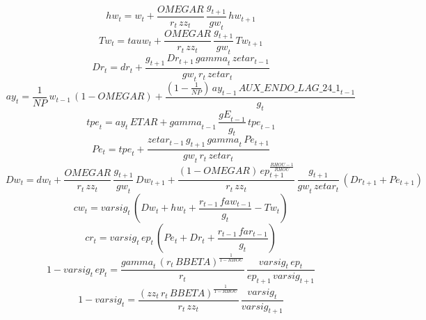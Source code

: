 \begin{dmath}
{hw}_{t}={w}_{t}+\frac{{OMEGAR}}{{r}_{t}\, {zz}_{t}}\, \frac{{g}_{t+1}}{{gw}_{t}}\, {hw}_{t+1}
\end{dmath}
\begin{dmath}
{Tw}_{t}={tauw}_{t}+\frac{{OMEGAR}}{{r}_{t}\, {zz}_{t}}\, \frac{{g}_{t+1}}{{gw}_{t}}\, {Tw}_{t+1}
\end{dmath}
\begin{dmath}
{Dr}_{t}={dr}_{t}+\frac{{g}_{t+1}\, {Dr}_{t+1}\, {gamma}_{t}\, {zetar}_{t-1}}{{gw}_{t}\, {r}_{t}\, {zetar}_{t}}
\end{dmath}
\begin{dmath}
{ay}_{t}=\frac{1}{{NP}}\, {w}_{t-1}\, \left(1-{OMEGAR}\right)+\frac{\left(1-\frac{1}{{NP}}\right)\, {ay}_{t-1}\, {AUX\_ENDO\_LAG\_24\_1}_{t-1}}{{g}_{t}}
\end{dmath}
\begin{dmath}
{tpe}_{t}={ay}_{t}\, {ETAR}+{gamma}_{t-1}\, \frac{{gE}_{t-1}}{{g}_{t}}\, {tpe}_{t-1}
\end{dmath}
\begin{dmath}
{Pe}_{t}={tpe}_{t}+\frac{{zetar}_{t-1}\, {g}_{t+1}\, {gamma}_{t}\, {Pe}_{t+1}}{{gw}_{t}\, {r}_{t}\, {zetar}_{t}}
\end{dmath}
\begin{dmath}
{Dw}_{t}={dw}_{t}+\frac{{OMEGAR}}{{r}_{t}\, {zz}_{t}}\, \frac{{g}_{t+1}}{{gw}_{t}}\, {Dw}_{t+1}+\frac{\left(1-{OMEGAR}\right)\, {ep}_{t+1}^{\frac{{RHOU}-1}{{RHOU}}}}{{r}_{t}\, {zz}_{t}}\, \frac{{g}_{t+1}}{{gw}_{t}\, {zetar}_{t}}\, \left({Dr}_{t+1}+{Pe}_{t+1}\right)
\end{dmath}
\begin{dmath}
{cw}_{t}={varsig}_{t}\, \left({Dw}_{t}+{hw}_{t}+\frac{{r}_{t-1}\, {faw}_{t-1}}{{g}_{t}}-{Tw}_{t}\right)
\end{dmath}
\begin{dmath}
{cr}_{t}={varsig}_{t}\, {ep}_{t}\, \left({Pe}_{t}+{Dr}_{t}+\frac{{r}_{t-1}\, {far}_{t-1}}{{g}_{t}}\right)
\end{dmath}
\begin{dmath}
1-{varsig}_{t}\, {ep}_{t}=\frac{{gamma}_{t}\, \left({r}_{t}\, {BBETA}\right)^{\frac{1}{1-{RHOU}}}}{{r}_{t}}\, \frac{{varsig}_{t}\, {ep}_{t}}{{ep}_{t+1}\, {varsig}_{t+1}}
\end{dmath}
\begin{dmath}
1-{varsig}_{t}=\frac{\left({zz}_{t}\, {r}_{t}\, {BBETA}\right)^{\frac{1}{1-{RHOU}}}}{{r}_{t}\, {zz}_{t}}\, \frac{{varsig}_{t}}{{varsig}_{t+1}}
\end{dmath}
